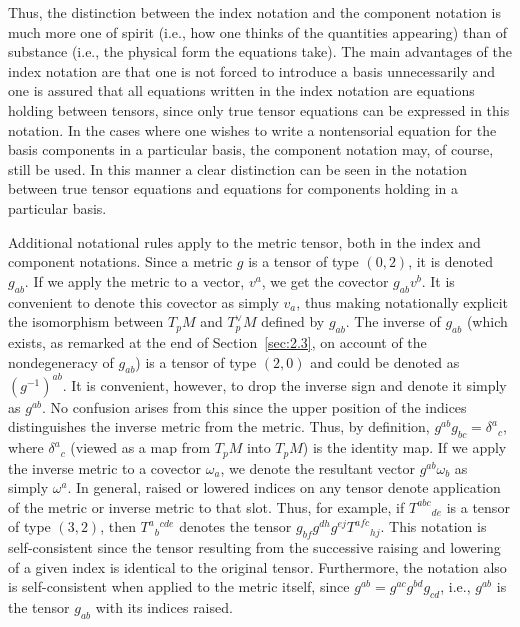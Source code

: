 Thus, the distinction between the index notation and the component notation is much
more one of spirit (i.e., how one thinks of the quantities appearing) than of
substance (i.e., the physical form the equations take).  The main advantages of the
index notation are that one is not forced to introduce a basis unnecessarily and one
is assured that all equations written in the index notation are equations holding
between tensors, since only true tensor equations can be expressed in this notation.
In the cases where one wishes to write a nontensorial equation for the basis
components in a particular basis, the component notation may, of course, still be
used.  In this manner a clear distinction can be seen in the notation between true
tensor equations and equations for components holding in a particular basis.

Additional notational rules apply to the metric tensor, both in the index and
component notations.  Since a metric \(g\) is a tensor of type \((0,2)\), it is
denoted \(g_{ab}\).  If we apply the metric to a vector, \(v^a\), we get the
covector \(g_{ab}v^b\).  It is convenient to denote this covector as simply
\(v_a\), thus making notationally explicit the isomorphism between \(T_pM\) and
\(T_p^\vee M\) defined by \(g_{ab}\).  The inverse of \(g_{ab}\) (which exists, as
remarked at the end of Section~\ref{sec:2.3}, on account of the nondegeneracy of
\(g_{ab}\)) is a tensor of type \((2,0)\) and could be denoted as
\((g^{-1})^{ab}\).  It is convenient, however, to drop the inverse sign and denote
it simply as \(g^{ab}\).  No confusion arises from this since the upper position of
the indices distinguishes the inverse metric from the metric.  Thus, by definition,
\(g^{ab}g_{bc}=\delta^a{}_c\), where \(\delta^a{}_c\) (viewed as a map from
\(T_pM\) into \(T_pM\)) is the identity map.  If we apply the inverse metric to a
covector \(\omega_a\), we denote the resultant vector \(g^{ab}\omega_b\) as
simply \(\omega^a\).  In general, raised or lowered indices on any tensor denote
application of the metric or inverse metric to that slot.  Thus, for example, if
\(T^{abc}{}_{de}\) is a tensor of type \((3,2)\), then \(T^a{}_b{}^{cde}\) denotes
the tensor \(g_{bf}g^{dh}g^{ej}T^{afc}{}_{hj}\).  This notation is self-consistent
since the tensor resulting from the successive raising and lowering of a given index
is identical to the original tensor.  Furthermore, the notation also is
self-consistent when applied to the metric itself, since
\(g^{ab}=g^{ac}g^{bd}g_{cd}\), i.e., \(g^{ab}\) is the tensor \(g_{ab}\) with its
indices raised.

